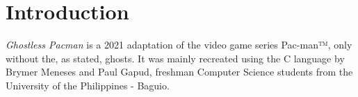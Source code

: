 
\section{Introduction}

\emph{Ghostless Pacman} is a 2021 adaptation of the video game series Pac-man™,
only without the, as stated, ghosts. It was mainly recreated using the C
language by Brymer Meneses and Paul Gapud, freshman Computer Science students
from the University of the Philippines - Baguio.
